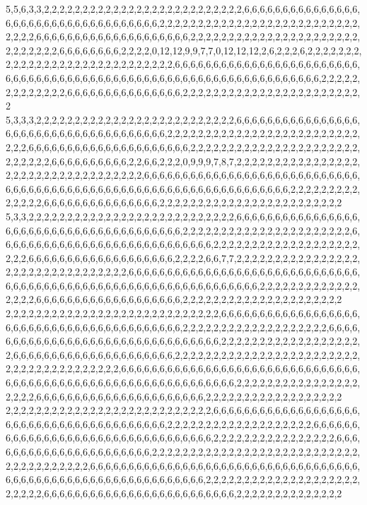 5,5,6,3,3,2,2,2,2,2,2,2,2,2,2,2,2,2,2,2,2,2,2,2,2,2,2,2,2,2,2,6,6,6,6,6,6,6,6,6,6,6,6,6,6,6,6,6,6,6,6,6,6,6,6,6,6,6,6,6,6,6,6,6,6,6,2,2,2,2,2,2,2,2,2,2,2,2,2,2,2,2,2,2,2,2,2,2,2,2,2,2,2,2,2,2,6,6,6,6,6,6,6,6,6,6,6,6,6,6,6,6,6,6,6,6,2,2,2,2,2,2,2,2,2,2,2,2,2,2,2,2,2,2,2,2,2,2,2,2,2,2,2,2,2,6,6,6,6,6,6,6,6,2,2,2,2,0,12,12,9,9,7,7,0,12,12,12,2,6,2,2,2,6,2,2,2,2,2,2,2,2,2,2,2,2,2,2,2,2,2,2,2,2,2,2,2,2,2,2,2,2,2,6,6,6,6,6,6,6,6,6,6,6,6,6,6,6,6,6,6,6,6,6,6,6,6,6,6,6,6,6,6,6,6,6,6,6,6,6,6,6,6,6,6,6,6,6,6,6,6,6,6,6,6,6,6,6,6,6,6,6,6,6,6,6,6,6,2,2,2,2,2,2,2,2,2,2,2,2,2,6,6,6,6,6,6,6,6,6,6,6,6,6,6,6,2,2,2,2,2,2,2,2,2,2,2,2,2,2,2,2,2,2,2,2,2,2,2,2
5,3,3,3,2,2,2,2,2,2,2,2,2,2,2,2,2,2,2,2,2,2,2,2,2,2,2,2,2,2,6,6,6,6,6,6,6,6,6,6,6,6,6,6,6,6,6,6,6,6,6,6,6,6,6,6,6,6,6,6,6,6,6,6,6,6,6,2,2,2,2,2,2,2,2,2,2,2,2,2,2,2,2,2,2,2,2,2,2,2,2,2,2,2,2,6,6,6,6,6,6,6,6,6,6,6,6,6,6,6,6,6,6,6,6,6,2,2,2,2,2,2,2,2,2,2,2,2,2,2,2,2,2,2,2,2,2,2,2,2,2,2,2,2,6,6,6,6,6,6,6,6,6,6,2,2,6,6,2,2,2,0,9,9,9,7,8,7,2,2,2,2,2,2,2,2,2,2,2,2,2,2,2,2,2,2,2,2,2,2,2,2,2,2,2,2,2,2,2,2,2,2,6,6,6,6,6,6,6,6,6,6,6,6,6,6,6,6,6,6,6,6,6,6,6,6,6,6,6,6,6,6,6,6,6,6,6,6,6,6,6,6,6,6,6,6,6,6,6,6,6,6,6,6,6,6,6,6,6,6,6,6,6,6,6,6,6,2,2,2,2,2,2,2,2,2,2,2,2,2,2,6,6,6,6,6,6,6,6,6,6,6,6,6,6,6,2,2,2,2,2,2,2,2,2,2,2,2,2,2,2,2,2,2,2,2,2,2,2,2
5,3,3,2,2,2,2,2,2,2,2,2,2,2,2,2,2,2,2,2,2,2,2,2,2,2,2,2,2,2,6,6,6,6,6,6,6,6,6,6,6,6,6,6,6,6,6,6,6,6,6,6,6,6,6,6,6,6,6,6,6,6,6,6,6,6,6,6,6,2,2,2,2,2,2,2,2,2,2,2,2,2,2,2,2,2,2,2,2,2,2,6,6,6,6,6,6,6,6,6,6,6,6,6,6,6,6,6,6,6,6,6,6,6,6,6,6,6,6,2,2,2,2,2,2,2,2,2,2,2,2,2,2,2,2,2,2,2,2,2,2,6,6,6,6,6,6,6,6,6,6,6,6,6,6,6,6,6,6,6,2,2,2,2,6,6,7,7,2,2,2,2,2,2,2,2,2,2,2,2,2,2,2,2,2,2,2,2,2,2,2,2,2,2,2,2,2,2,2,2,6,6,6,6,6,6,6,6,6,6,6,6,6,6,6,6,6,6,6,6,6,6,6,6,6,6,6,6,6,6,6,6,6,6,6,6,6,6,6,6,6,6,6,6,6,6,6,6,6,6,6,6,6,6,6,6,6,6,6,6,6,6,6,2,2,2,2,2,2,2,2,2,2,2,2,2,2,2,2,2,6,6,6,6,6,6,6,6,6,6,6,6,6,6,6,6,6,6,6,2,2,2,2,2,2,2,2,2,2,2,2,2,2,2,2,2,2,2,2,2
2,2,2,2,2,2,2,2,2,2,2,2,2,2,2,2,2,2,2,2,2,2,2,2,2,2,2,2,6,6,6,6,6,6,6,6,6,6,6,6,6,6,6,6,6,6,6,6,6,6,6,6,6,6,6,6,6,6,6,6,6,6,6,6,6,6,6,6,6,2,2,2,2,2,2,2,2,2,2,2,2,2,2,2,2,2,2,2,6,6,6,6,6,6,6,6,6,6,6,6,6,6,6,6,6,6,6,6,6,6,6,6,6,6,6,6,6,6,6,6,2,2,2,2,2,2,2,2,2,2,2,2,2,2,2,2,2,2,2,6,6,6,6,6,6,6,6,6,6,6,6,6,6,6,6,6,6,6,6,6,2,2,2,2,2,2,2,2,2,2,2,2,2,2,2,2,2,2,2,2,2,2,2,2,2,2,2,2,2,2,2,2,2,2,2,2,2,2,2,6,6,6,6,6,6,6,6,6,6,6,6,6,6,6,6,6,6,6,6,6,6,6,6,6,6,6,6,6,6,6,6,6,6,6,6,6,6,6,6,6,6,6,6,6,6,6,6,6,6,6,6,6,6,6,6,6,6,6,6,6,2,2,2,2,2,2,2,2,2,2,2,2,2,2,2,2,2,2,2,2,6,6,6,6,6,6,6,6,6,6,6,6,6,6,6,6,6,6,6,6,6,6,2,2,2,2,2,2,2,2,2,2,2,2,2,2,2,2,2,2
2,2,2,2,2,2,2,2,2,2,2,2,2,2,2,2,2,2,2,2,2,2,2,2,2,2,2,6,6,6,6,6,6,6,6,6,6,6,6,6,6,6,6,6,6,6,6,6,6,6,6,6,6,6,6,6,6,6,6,6,6,6,6,6,6,6,6,2,2,2,2,2,2,2,2,2,2,2,2,2,2,2,2,2,2,2,6,6,6,6,6,6,6,6,6,6,6,6,6,6,6,6,6,6,6,6,6,6,6,6,6,6,6,6,6,6,6,6,6,2,2,2,2,2,2,2,2,2,2,2,2,2,2,2,2,6,6,6,6,6,6,6,6,6,6,6,6,6,6,6,6,6,6,6,6,6,6,2,2,2,2,2,2,2,2,2,2,2,2,2,2,2,2,2,2,2,2,2,2,2,2,2,2,2,2,2,2,2,2,2,2,2,2,2,2,6,6,6,6,6,6,6,6,6,6,6,6,6,6,6,6,6,6,6,6,6,6,6,6,6,6,6,6,6,6,6,6,6,6,6,6,6,6,6,6,6,6,6,6,6,6,6,6,6,6,6,6,6,6,6,6,6,6,6,6,6,2,2,2,2,2,2,2,2,2,2,2,2,2,2,2,2,2,2,2,2,2,2,2,2,2,6,6,6,6,6,6,6,6,6,6,6,6,6,6,6,6,6,6,6,6,6,6,6,6,6,2,2,2,2,2,2,2,2,2,2,2,2,2,2
